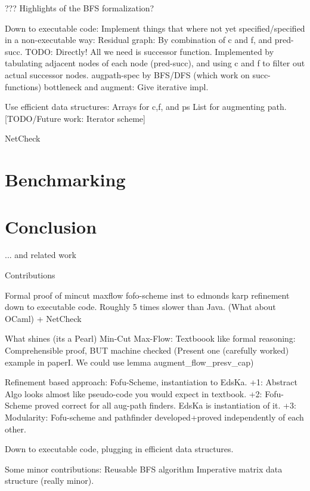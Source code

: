 \documentclass{llncs}
\begin{document}
        ??? Highlights of the BFS formalization?
    
  Down to executable code:
    Implement things that where not yet specified/specified in a non-executable way:
      Residual graph: By combination of c and f, and pred-succ. TODO: Directly!
        All we need is successor function. Implemented by tabulating 
          adjacent nodes of each node (pred-succ), and using c and f to filter out actual successor nodes. 
      augpath-spec by BFS/DFS (which work on succ-functions)
      bottleneck and augment: Give iterative impl.
      
    Use efficient data structures:
      Arrays for c,f, and ps
      List for augmenting path. [TODO/Future work: Iterator scheme]
  
  


  
  NetCheck

\section{Benchmarking}
\section{Conclusion} 
  ... and related work


  
Contributions

  Formal proof of mincut maxflow
  fofo-scheme
  inst to edmonds karp
  refinement down to executable code. Roughly 5 times slower than Java. (What about OCaml)
    + NetCheck
    
What shines (its a Pearl)
  Min-Cut Max-Flow: Textboook like formal reasoning: Comprehensible proof, BUT machine checked
    (Present one (carefully worked) example in paperI. We could use lemma augment_flow_presv_cap)
    
  Refinement based approach: Fofu-Scheme, instantiation to EdsKa. 
    +1: Abstract Algo looks almost like pseudo-code you would expect in textbook.
    +2: Fofu-Scheme proved correct for all aug-path finders. EdsKa is instantiation of it.
    +3: Modularity: Fofu-scheme and pathfinder developed+proved independently of each other.
  
  Down to executable code, plugging in efficient data structures.
  
Some minor contributions:
  Reusable BFS algorithm
  Imperative matrix data structure (really minor).
  
  
  
    









\end{document}
